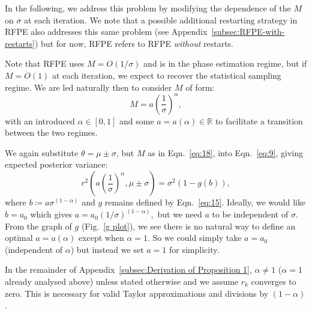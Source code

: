 \documentclass[twocolumn,
 reprint,
 amsmath,amssymb,
 aps,
 floatfix,
superscriptaddress
]{revtex4-1}
\begin{document}
In the following, we address this problem by modifying the dependence
of the $M$ on $\sigma$ at each iteration. We note that a
possible additional restarting strategy in RFPE also addresses this
same problem (see Appendix~\ref{subsec:RFPE-with-restarts}) but for now, RFPE refers to
RFPE \textit{without} restarts. 

Note that RFPE uses $M=O(1/\sigma)$ and is in the phase estimation
regime, but if $M=O(1)$ at each iteration, we expect to recover the
statistical sampling regime. We are led naturally then to consider
$M$ of form:
\begin{equation}\label{eq:18}
M=a(\frac{1}{\sigma})^{\alpha},
\end{equation}
with an introduced $\alpha\in[0,1]$ and some $a=a(\alpha)\in\mathbb{R}$
to facilitate a transition between the two regimes.

We again substitute $\theta=\mu\pm\sigma$, but $M$
as in Eqn.~\ref{eq:18}, into Eqn.~\ref{eq:9}, giving expected posterior variance:
\begin{equation}\label{eq:19}
r^{2}(a(\frac{1}{\sigma})^{\alpha},\mu\pm\sigma)=\sigma^{2}(1-g(b)),
\end{equation}
where $b\coloneqq a\sigma^{(1-\alpha)}$ and $g$ remains defined by Eqn.~\ref{eq:15}.
Ideally, we would like $b=a_{0}$ which gives $a=a_{0}(1/\sigma)^{(1-\alpha)},$
but we need $a$ to be independent of $\sigma$. From the graph of
$g$ (Fig.~\ref{g plot}), we see there is no natural way to
define an optimal $a=a(\alpha)$ except when $\alpha=1$. So we could
simply take $a=a_{0}$ (independent of $\alpha$) but instead
we set $a=1$ for simplicity. 

In the remainder of Appendix~\ref{subsec:Derivation of Proposition 1}, $\alpha\neq1$ ($\alpha=1$
already analysed above) unless stated otherwise and we assume $r_{k}$ converges to zero. This is necessary
for valid Taylor approximations and divisions by $(1-\alpha)$. 
\end{document}
